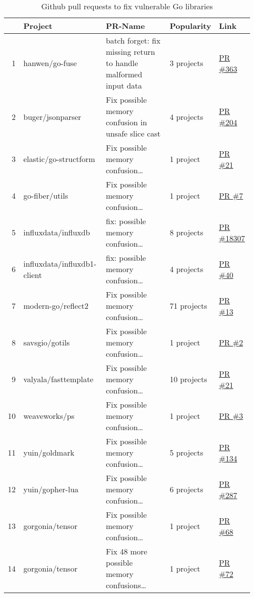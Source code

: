 \begin{table}[h]
    \centering
    \caption{Github pull requests to fix vulnerable Go libraries}
    \label{tbl:pull-requests}
    \begin{tabularx}{\textwidth}{rlXll}
        \toprule
        {} & Project & PR-Name & Popularity & Link \\
        \midrule
        1  & hanwen/go-fuse & batch forget: fix missing return to handle malformed input data & 3 projects & \href{https://www.github.com/hanwen/go-fuse/pull/363}{PR \#363} \\
        2  & buger/jsonparser & Fix possible memory confusion in unsafe slice cast & 4 projects & \href{https://www.github.com/buger/jsonparser/pull/204}{PR \#204} \\
        3  & elastic/go-structform & Fix possible memory confusion\ldots & 1 project & \href{https://github.com/elastic/go-structform/pull/21}{PR \#21} \\
        4  & go-fiber/utils & Fix possible memory confusion\ldots & 1 project & \href{https://github.com/gofiber/utils/pull/7}{PR \#7} \\
        5  & influxdata/influxdb & fix: possible memory confusion\ldots & 8 projects & \href{https://github.com/influxdata/influxdb/pull/18307}{PR \#18307} \\
        6  & influxdata/influxdb1-client & fix: possible memory confusion\ldots & 4 projects & \href{https://github.com/influxdata/influxdb1-client/pull/40}{PR \#40} \\
        7  & modern-go/reflect2 & Fix possible memory confusion\ldots & 71 projects & \href{https://github.com/modern-go/reflect2/pull/13}{PR \#13} \\
        8  & savsgio/gotils & Fix possible memory confusion\ldots & 1 project & \href{https://github.com/savsgio/gotils/pull/2}{PR \#2} \\
        9  & valyala/fasttemplate & Fix possible memory confusion\ldots & 10 projects & \href{https://github.com/valyala/fasttemplate/pull/21}{PR \#21} \\
        10 & weaveworks/ps & Fix possible memory confusion\ldots & 1 project & \href{https://github.com/weaveworks/ps/pull/3}{PR \#3} \\
        11 & yuin/goldmark & Fix possible memory confusion\ldots & 5 projects & \href{https://github.com/yuin/goldmark/pull/134}{PR \#134} \\
        12 & yuin/gopher-lua & Fix possible memory confusion\ldots & 6 projects & \href{https://github.com/yuin/gopher-lua/pull/287}{PR \#287} \\
        13 & gorgonia/tensor & Fix possible memory confusion\ldots & 1 project & \href{https://github.com/gorgonia/tensor/pull/68}{PR \#68} \\
        14 & gorgonia/tensor & Fix 48 more possible memory confusions\ldots & 1 project & \href{https://github.com/gorgonia/tensor/pull/72}{PR \#72} \\
        \bottomrule
    \end{tabularx}
\end{table}